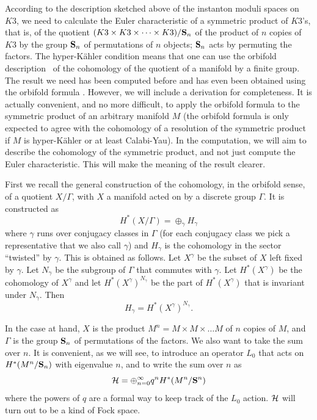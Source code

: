 \documentclass[12pt]{article}
\numberwithin{equation}{section}
\begin{document}
\bigskip
{}

According to the description sketched above of the instanton moduli
spaces on $K3$, we need to calculate the Euler characteristic
of a symmetric product of $K3$'s, that is, of the quotient
$(K3\times K3\times \dots \times K3)/{\bf S}_n$ of the product
of $n$ copies of $K3$ by the group ${\bf S}_n$ of permutations of
$n$ objects; ${\bf S}_n$ acts by permuting the factors.
The hyper-K\"ahler condition means that one can use
the orbifold description \cite{orb}\ of the cohomology of
the quotient of a manifold by a finite group.
The result we need has been computed before
\cite{Gott} and has even been obtained using the orbifold
formula \cite{hirz}.  However, we will include a derivation
for completeness.  It is actually convenient, and no more difficult,
to apply the orbifold formula to the symmetric product of an arbitrary
manifold $M$ (the orbifold formula is only expected to agree with
  the cohomology of a resolution of the symmetric product if $M$ is
hyper-K\"ahler or at least Calabi-Yau).
In the computation, we will aim to describe the cohomology of the
symmetric product, and not just compute the Euler characteristic.
This will make the meaning of the result clearer.

First we recall the general construction
of the cohomology, in the
orbifold sense,
of a quotient $X/\Gamma$, with $X$ a manifold acted on by a discrete
group $\Gamma$.
It is constructed as
\begin{equation}
  \label{inon}
  H^*(X/\Gamma)=\oplus_\gamma H_\gamma
\end{equation}
where $\gamma$ runs over conjugacy classes in $\Gamma$ (for each
conjugacy class we pick a representative that we also call $\gamma$)
and $H_\gamma$
is the cohomology in the sector ``twisted'' by $\gamma$.  This is obtained
as follows.  Let $X^\gamma$ be the subset of $X$ left fixed by $\gamma$.
Let $N_\gamma$ be the subgroup of $\Gamma$ that commutes with $\gamma$.
Let $H^*(X^\gamma)$ be the cohomology of $X^\gamma$ and let
$H^*(X^\gamma)^{N_\gamma}$ be the part of $H^*(X^\gamma)$ that is
invariant under $N_\gamma$.  Then
\begin{equation}
  \label{minon}
  H_\gamma =H^*(X^\gamma)^{N_\gamma}.
\end{equation}

In the case at hand, $X$ is the product $M^n=M\times M\times \dots M$
of $n$ copies of $M$, and $\Gamma$ is the group ${\bf S}_n$
of permutations of the factors.  We also want to take the sum over
$n$.  It is convenient, as we will see, to introduce an operator $L_0$
that acts on $H^*(M^n/{\bf S}_n)$ with eigenvalue $n$, and to write
the sum over $n$ as
\begin{equation}
  \label{hipo}
  {\cal H}=\oplus_{n=0}^\infty q^nH^*(M^n/{\bf S}^n)
\end{equation}
where the powers of $q$ are a formal way to keep track of the $L_0$ action.
${\cal H}$ will turn out to be a kind of Fock space.
\end{document}
